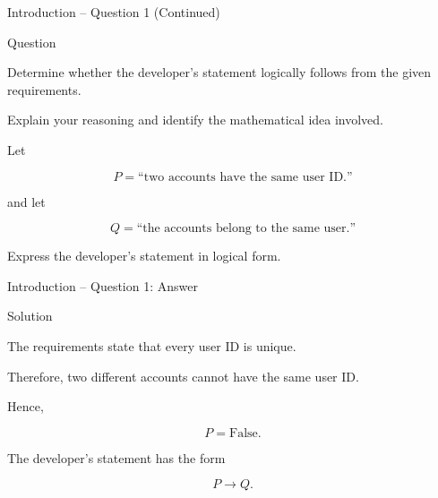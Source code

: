 
\begin{frame}{Introduction -- Question 1 (Continued)}

\begin{block}{Question}

Determine whether the developer's statement logically follows from the
given requirements.

\medskip

Explain your reasoning and identify the mathematical idea involved.

\medskip

Let

\[
P=\text{``two accounts have the same user ID.''}
\]

and let

\[
Q=\text{``the accounts belong to the same user.''}
\]

Express the developer's statement in logical form.

\end{block}

\end{frame}


\begin{frame}{Introduction -- Question 1: Answer}

\begin{exampleblock}{Solution}

The requirements state that every user ID is unique.

Therefore, two different accounts cannot have the same user ID.

Hence,

\[
P=\mathrm{False}.
\]

The developer's statement has the form

\[
P\rightarrow Q.
\]

\end{exampleblock}

\end{frame}


